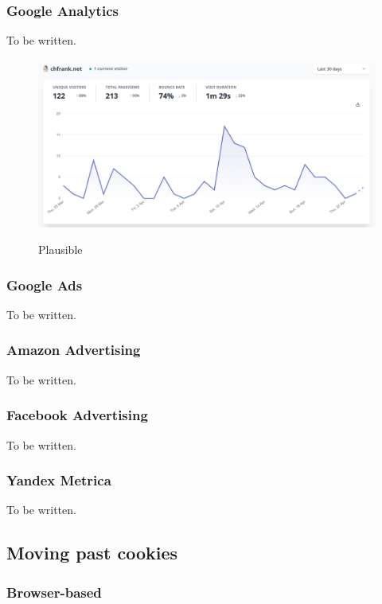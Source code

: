 \subsubsection{Google Analytics}

To be written.

\begin{figure}[H]
\centering
\caption {Plausible}
\includegraphics[width=\linewidth]{images/plausible.png}
\label{fig:plausible}
\end{figure}

\subsubsection{Google Ads}

To be written.

\subsubsection{Amazon Advertising}

To be written.

\subsubsection{Facebook Advertising}

To be written.

\subsubsection{Yandex Metrica}

To be written.

\subsection{Moving past cookies}

\subsubsection{Browser-based}

